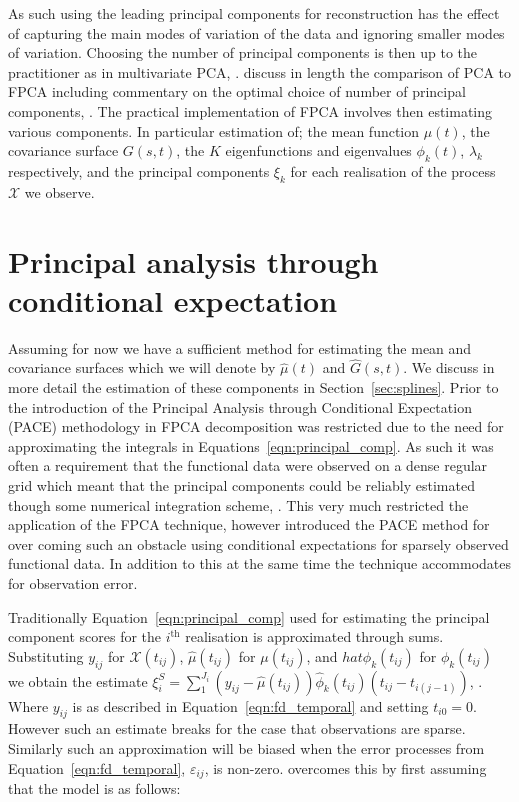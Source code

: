 As such using the leading principal components for reconstruction has the effect of capturing the main modes of variation of the data and ignoring smaller modes of variation.
Choosing the number of principal components is then up to the practitioner as in multivariate PCA, \citep{wold_principal_1987}.
 \citeauthor{ramsay_functional_2010} discuss in length the comparison of PCA to FPCA including commentary on the optimal choice of number of principal components, \cite[Chapter~8]{ramsay_functional_2010}.
 The practical implementation of FPCA involves then estimating various components.
 In particular estimation of;  the mean function $\mu(t)$, the covariance surface $G\left(s,t \right)$, the $K$ eigenfunctions and eigenvalues $\phi_k(t)$, $\lambda_k$ respectively, and the principal components $\xi_k$ for each realisation of the process $\mathcal{X}$ we observe.

\section{Principal analysis through conditional expectation \label{sec:pace}}
Assuming for now we have a sufficient method for estimating the mean  and covariance surfaces which we will denote by $\hat{\mu}(t)$ and $\hat{G}\left(s, t \right)$.
We discuss in more detail the estimation of these components in Section~\ref{sec:splines}.
Prior to the introduction of the Principal Analysis through Conditional Expectation (PACE) methodology in \citep{yao_functional_2005} FPCA decomposition was restricted due to the need for approximating the integrals in Equations~\eqref{eqn:principal_comp}.
As such it was often a requirement that the functional data were observed on a dense regular grid which meant that the principal components could be reliably estimated though some numerical integration scheme, \citep[Chapter~8]{ramsay_functional_2010}.
This very much restricted the application of the FPCA technique, however \citeauthor{yao_functional_2005} introduced the PACE method for over coming such an obstacle using conditional expectations for sparsely observed functional data.
In addition to this at the same time the technique accommodates for observation error. 

Traditionally Equation~\eqref{eqn:principal_comp} used for estimating the principal component scores for the $i^\text{th}$ realisation is approximated through sums.
Substituting $y_{ij}$ for $\mathcal{X}(t_{ij})$, $\hat{\mu}(t_{ij})$ for $\mu(t_{ij})$, and $hat{\phi}_k(t_{ij})$ for  $\phi_k(t_{ij})$ we obtain the estimate $\xi_i^{S} = \sum_1^{J_i}\left(y_{ij} - \hat{\mu}(t_{ij})\right)\hat{\phi}_k(t_{ij})\left(t_{ij} - t_{i(j-1)}\right)$, \citep{yao_functional_2005}.
Where $y_{ij}$ is as described in Equation~\eqref{eqn:fd_temporal} and setting $t_{i0}=0$.
However such an estimate breaks for the case that observations are sparse. Similarly such an approximation will be biased when the error processes from Equation~\eqref{eqn:fd_temporal}, $\varepsilon_{ij}$, is non-zero.
\citeauthor{yao_functional_2005} overcomes this by first assuming that the model is as follows:

